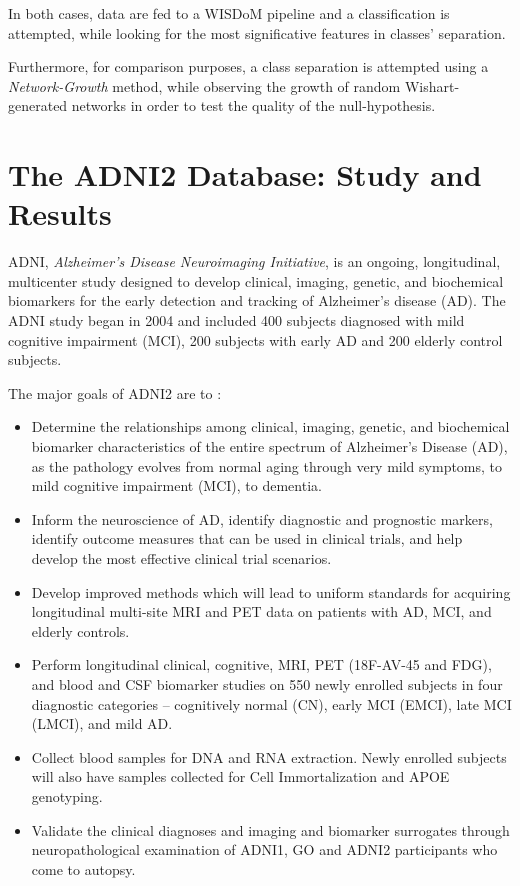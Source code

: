 \documentclass[12pt,openright,twoside,a4paper]{book}
\begin{document}
In both cases, data are fed to a WISDoM pipeline and a classification is attempted, while looking for the most significative features in classes' separation.

Furthermore, for comparison purposes, a class separation is attempted using a \textit{Network-Growth} method, while observing  the growth of random Wishart-generated networks in order to test the quality of the null-hypothesis.
\clearpage

\section{The ADNI2 Database: Study and Results}

ADNI, \textit{Alzheimer's Disease Neuroimaging Initiative}, is an ongoing, longitudinal, multicenter study designed to develop clinical, imaging, genetic, and biochemical biomarkers for the early detection and tracking of Alzheimer’s disease (AD). The ADNI study began in 2004 and included 400 subjects diagnosed with mild cognitive impairment (MCI), 200 subjects with early AD and 200 elderly control subjects.

The major goals of ADNI2 are to \cite{Adni}:

\begin{itemize}
\item Determine the relationships among clinical, imaging, genetic, and biochemical biomarker characteristics of the entire spectrum of Alzheimer’s Disease (AD), as the pathology evolves from normal aging through very mild symptoms, to mild cognitive impairment (MCI), to dementia.

\item Inform the neuroscience of AD, identify diagnostic and prognostic markers, identify outcome measures that can be used in clinical trials, and help develop the most effective clinical trial scenarios.

\item Develop improved methods which will lead to uniform standards for acquiring longitudinal multi-site MRI and PET data on patients with AD, MCI, and elderly controls.

\item Perform longitudinal clinical, cognitive, MRI, PET (18F-AV-45 and
FDG), and blood and CSF biomarker studies on 550 newly enrolled
subjects in four diagnostic categories – cognitively normal (CN),
early MCI (EMCI), late MCI (LMCI), and mild AD. 

\item Collect blood samples for DNA and RNA extraction. Newly enrolled subjects will also have samples collected for Cell Immortalization and APOE genotyping.

\item Validate the clinical diagnoses and imaging and biomarker surrogates through neuropathological examination of ADNI1, GO and ADNI2 participants who come to autopsy.

\end{itemize}
\end{document}
